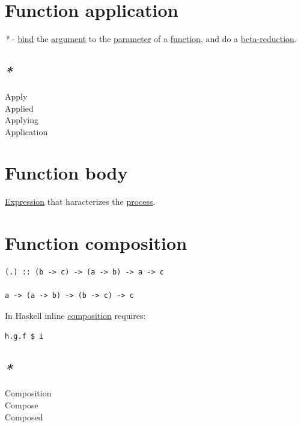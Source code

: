 \documentclass[a4paper,14pt,oneside]{book}
\begin{document}
\section{\label{org75fdc7c}Function application}
\label{sec:org3796980}
\emph{*} - \hyperref[orgaa2cbda]{bind} the \hyperref[org64a41d1]{argument} to the \hyperref[org65aaf9b]{parameter} of a \hyperref[orgad0a745]{function}, and do a \hyperref[org42a574b]{beta-reduction}.\\

\subsection{\emph{*}}
\label{sec:orgc6496ff}

\label{org2f1e50b}Apply\\
\label{orgcf7c142}Applied\\
\label{org2613141}Applying\\
\label{org5049d91}Application\\

\section{\label{org6762ce8}Function body}
\label{sec:orge4597b8}
\hyperref[org70841e3]{Expression} that haracterizes the \hyperref[orgfdfd3f6]{process}.\\

\section{\label{orgee2889d}Function composition}
\label{sec:orgaed35d1}
\begin{verbatim}
(.) :: (b -> c) -> (a -> b) -> a -> c

a -> (a -> b) -> (b -> c) -> c
\end{verbatim}

In Haskell inline \hyperref[orgd137e35]{composition} requires:\\
\begin{verbatim}
h.g.f $ i
\end{verbatim}

\subsection{\emph{*}}
\label{sec:orgab6608d}

\label{orgd37b23c}Composition\\
\label{org5e9fb57}Compose\\
\label{orgca6092d}Composed\\
\end{document}
